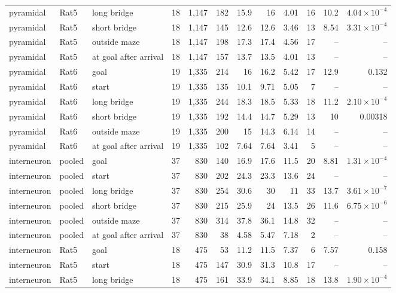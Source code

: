 \begin{table}[htbp]
\begin{tabular}{lllrrrrrrrrr}
pyramidal & Rat5 & long bridge & 18 & 1{,}147 & 182 & 15.9 & 16 & 4.01 & 16 & 10.2 & $4.04\times10^{-4}$ \\
pyramidal & Rat5 & short bridge & 18 & 1{,}147 & 145 & 12.6 & 12.6 & 3.46 & 13 & 8.54 & $3.31\times10^{-4}$ \\
pyramidal & Rat5 & outside maze & 18 & 1{,}147 & 198 & 17.3 & 17.4 & 4.56 & 17 & -- & -- \\
pyramidal & Rat5 & at goal after arrival & 18 & 1{,}147 & 157 & 13.7 & 13.5 & 4.01 & 13 & -- & -- \\
pyramidal & Rat6 & goal & 19 & 1{,}335 & 214 & 16 & 16.2 & 5.42 & 17 & 12.9 & 0.132 \\
pyramidal & Rat6 & start & 19 & 1{,}335 & 135 & 10.1 & 9.71 & 5.05 & 7 & -- & -- \\
pyramidal & Rat6 & long bridge & 19 & 1{,}335 & 244 & 18.3 & 18.5 & 5.33 & 18 & 11.2 & $2.10\times10^{-4}$ \\
pyramidal & Rat6 & short bridge & 19 & 1{,}335 & 192 & 14.4 & 14.7 & 5.29 & 13 & 10 & 0.00318 \\
pyramidal & Rat6 & outside maze & 19 & 1{,}335 & 200 & 15 & 14.3 & 6.14 & 14 & -- & -- \\
pyramidal & Rat6 & at goal after arrival & 19 & 1{,}335 & 102 & 7.64 & 7.64 & 3.41 & 5 & -- & -- \\
interneuron & pooled & goal & 37 & 830 & 140 & 16.9 & 17.6 & 11.5 & 20 & 8.81 & $1.31\times10^{-4}$ \\
interneuron & pooled & start & 37 & 830 & 202 & 24.3 & 23.3 & 13.6 & 24 & -- & -- \\
interneuron & pooled & long bridge & 37 & 830 & 254 & 30.6 & 30 & 11 & 33 & 13.7 & $3.61\times10^{-7}$ \\
interneuron & pooled & short bridge & 37 & 830 & 215 & 25.9 & 24 & 13.5 & 26 & 11.6 & $6.75\times10^{-6}$ \\
interneuron & pooled & outside maze & 37 & 830 & 314 & 37.8 & 36.1 & 14.8 & 32 & -- & -- \\
interneuron & pooled & at goal after arrival & 37 & 830 & 38 & 4.58 & 5.47 & 7.18 & 2 & -- & -- \\
interneuron & Rat5 & goal & 18 & 475 & 53 & 11.2 & 11.5 & 7.37 & 6 & 7.57 & 0.158 \\
interneuron & Rat5 & start & 18 & 475 & 147 & 30.9 & 31.3 & 10.8 & 17 & -- & -- \\
interneuron & Rat5 & long bridge & 18 & 475 & 161 & 33.9 & 34.1 & 8.85 & 18 & 13.8 & $1.90\times10^{-4}$ \\

\end{tabular}
\end{table}
